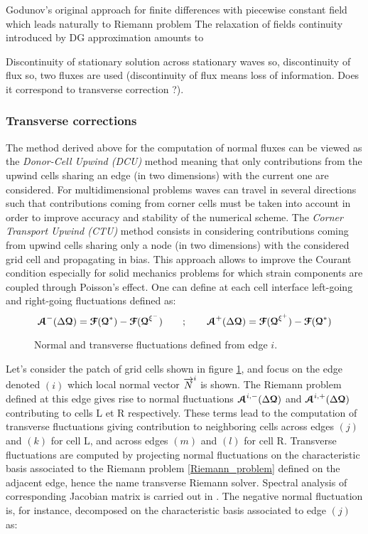 Godunov's original approach for finite differences with piecewise constant field which leads naturally to Riemann problem
The relaxation of fields continuity introduced by DG approximation amounts to 

Discontinuity of stationary solution across stationary waves so, discontinuity of flux so, two fluxes are used (discontinuity of flux means loss of information. Does it correspond to transverse correction ?).
\subsubsection*{Transverse corrections}
The method derived above for the computation of normal fluxes can be viewed as the \textit{Donor-Cell Upwind (DCU)} method \cite{Leveque} meaning that only contributions from the upwind cells sharing an edge (in two dimensions) with the current one are considered. For multidimensional problems waves can travel in several directions such that contributions coming from corner cells must be taken into account in order to improve accuracy and stability of the numerical scheme. The \textit{Corner Transport Upwind (CTU)} method \cite{Colella_CTU} consists in considering contributions coming from upwind cells sharing only a node (in two dimensions) with the considered grid cell and propagating in bias. This approach allows to improve the Courant condition especially for solid mechanics problems for which strain components are coupled through Poisson's effect. One can define at each cell interface left-going and right-going fluctuations defined as:
\begin{equation}
  {\boldsymbol{\mathcal{A}}}^-(\Delta {\boldsymbol{\mathcal{Q}}}) = {\boldsymbol{\mathcal{F}}}({\boldsymbol{\mathcal{Q}}}^*) - {\boldsymbol{\mathcal{F}}}({\boldsymbol{\mathcal{Q}}}^{\xi^-}) \qquad ;  \qquad {\boldsymbol{\mathcal{A}}}^+(\Delta {\boldsymbol{\mathcal{Q}}}) = {\boldsymbol{\mathcal{F}}}({\boldsymbol{\mathcal{Q}}}^{\xi^+})-{\boldsymbol{\mathcal{F}}}({\boldsymbol{\mathcal{Q}}}^*) 
\end{equation}
\begin{figure}[h!]
  \centering
  
  \caption{Normal and transverse fluctuations defined from edge $i$.}
  \label{fig:CTU}
\end{figure}
Let's consider the patch of grid cells shown in figure \ref{fig:CTU}, and focus on the edge denoted $(i)$ which local normal vector ${\overrightarrow{N}}^i$ is shown. The Riemann problem defined at this edge gives rise to normal fluctuations ${\boldsymbol{\mathcal{A}}}^{i,-}(\Delta {\boldsymbol{\mathcal{Q}}})$ and ${\boldsymbol{\mathcal{A}}}^{i,+}(\Delta {\boldsymbol{\mathcal{Q}}})$ contributing to cells L et R respectively. These terms lead to the computation of transverse fluctuations giving contribution to neighboring cells across edges $(j)$ and $(k)$ for cell L, and across edges $(m)$ and $(l)$ for cell R. Transverse fluctuations are computed by projecting normal fluctuations on the characteristic basis associated to the Riemann problem \eqref{Riemann_problem} defined on the adjacent edge, hence the name transverse Riemann solver. Spectral analysis of corresponding Jacobian matrix is carried out in \cite{Kluth}. The negative normal fluctuation is, for instance, decomposed on the characteristic basis associated to edge $(j)$ as:
